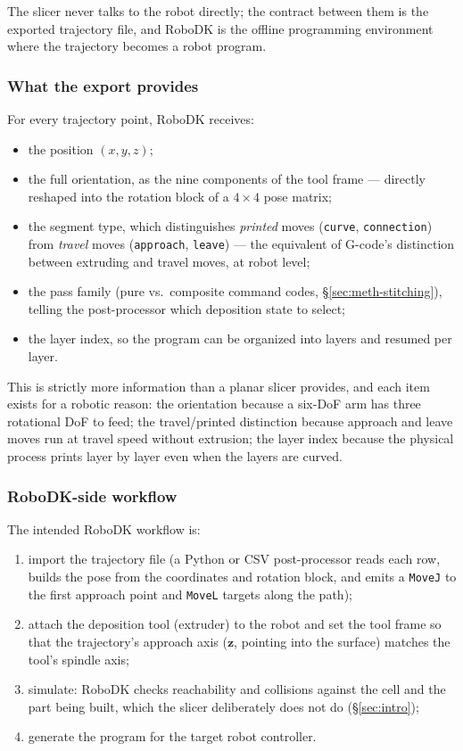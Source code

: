 The slicer never talks to the robot directly; the contract between
them is the exported trajectory file, and RoboDK is the offline
programming environment where the trajectory becomes a robot program.

\subsubsection{What the export provides}

For every trajectory point, RoboDK receives:
\begin{itemize}
  \item the position $(x, y, z)$;
  \item the full orientation, as the nine components of the tool frame
        --- directly reshaped into the rotation block of a $4 \times 4$
        pose matrix;
  \item the segment type, which distinguishes \emph{printed} moves
        (\texttt{curve}, \texttt{connection}) from \emph{travel} moves
        (\texttt{approach}, \texttt{leave}) --- the equivalent of
        G-code's distinction between extruding and travel moves, at
        robot level;
  \item the pass family (pure vs.\ composite command codes, 
        \S\ref{sec:meth-stitching}), telling the post-processor which
        deposition state to select;
  \item the layer index, so the program can be organized into layers
        and resumed per layer.
\end{itemize}

This is strictly more information than a planar slicer provides, and
each item exists for a robotic reason: the orientation because a
six-DoF arm has three rotational DoF to feed; the travel/printed
distinction because approach and leave moves run at travel speed
without extrusion; the layer index because the physical process
prints layer by layer even when the layers are curved.

\subsubsection{RoboDK-side workflow}

The intended RoboDK workflow is:
\begin{enumerate}
  \item import the trajectory file (a Python or CSV post-processor
        reads each row, builds the pose from the coordinates and
        rotation block, and emits a \texttt{MoveJ} to the first
        approach point and \texttt{MoveL} targets along the path);
  \item attach the deposition tool (extruder) to the robot and set the
        tool frame so that the trajectory's approach axis
        ($\mathbf{z}$, pointing into the surface) matches the tool's
        spindle axis;
  \item simulate: RoboDK checks reachability and collisions against
        the cell and the part being built, which the slicer
        deliberately does not do (\S\ref{sec:intro});
  \item generate the program for the target robot controller.
\end{enumerate}

